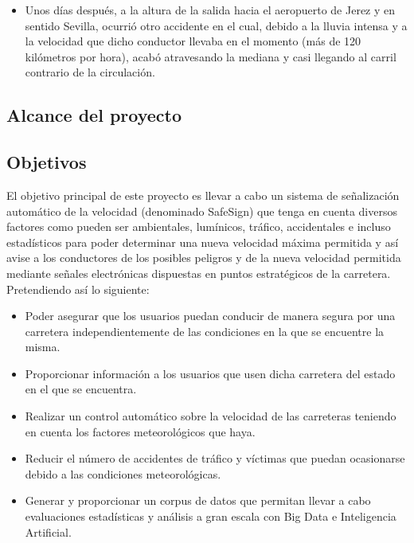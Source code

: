 \documentclass[
	a4paper, %
	12pt, %
]{CSSullivanBusinessReport}
\begin{document}
\begin{fullwidth}
\begin{itemize}
    \item Unos días después, a la altura de la salida hacia el aeropuerto de Jerez y en sentido Sevilla, ocurrió otro accidente en el cual, debido a la lluvia intensa y a la velocidad que dicho conductor llevaba en el momento (más de 120 kilómetros por hora), acabó atravesando la mediana y casi llegando al carril contrario de la circulación.
\end{itemize}
\end{fullwidth}
\newpage
\begin{fullwidth}
    

\section{Alcance del proyecto}
\subsection{Objetivos}
El objetivo principal de este proyecto es llevar a cabo un sistema de señalización automático de la velocidad (denominado SafeSign) que tenga en cuenta diversos factores como pueden ser ambientales, lumínicos, tráfico, accidentales e incluso estadísticos para poder determinar una nueva velocidad máxima permitida y así avise a los conductores de los posibles peligros y de la nueva velocidad permitida mediante señales electrónicas dispuestas en puntos estratégicos de la carretera. Pretendiendo así lo siguiente:  
\begin{itemize}
    \item Poder asegurar que los usuarios puedan conducir de manera segura por una carretera independientemente de las condiciones en la que se encuentre la misma. 

    \item Proporcionar información a los usuarios que usen dicha carretera del estado en el que se encuentra.

    \item Realizar un control automático sobre la velocidad de las carreteras teniendo en cuenta los factores meteorológicos que haya. 

    \item  Reducir el número de accidentes de tráfico y víctimas que puedan ocasionarse debido a las condiciones meteorológicas. 

    \item  Generar y proporcionar un corpus de datos que permitan llevar a cabo evaluaciones estadísticas y análisis a gran escala con Big Data e Inteligencia Artificial. 


\end{itemize}
\end{fullwidth}
\end{document}
